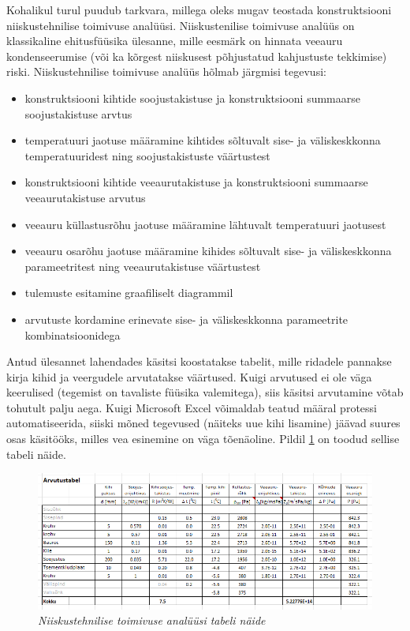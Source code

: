 Kohalikul turul puudub tarkvara, millega oleks mugav teostada konstruktsiooni
 niiskustehnilise toimivuse analüüsi. Niiskustenilise toimivuse analüüs on klassikaline ehitusfüüsika ülesanne, mille 
 eesmärk on hinnata veeauru kondenseerumise (või ka kõrgest niiskusest põhjustatud kahjustuste tekkimise) riski.
Niiskustehnilise toimivuse analüüs hõlmab järgmisi tegevusi:
\begin{itemize}
    \item konstruktsiooni kihtide soojustakistuse ja konstruktsiooni summaarse soojustakistuse arvtus
    \item temperatuuri jaotuse määramine kihtides sõltuvalt sise- ja väliskeskkonna temperatuuridest ning 
    soojustakistuste väärtustest
    \item konstruktsiooni kihtide veeaurutakistuse ja konstruktsiooni summaarse veeaurutakistuse arvutus
    \item veeauru küllastusrõhu jaotuse määramine lähtuvalt temperatuuri jaotusest
    \item veeauru osarõhu jaotuse määramine kihides sõltuvalt sise- ja väliskeskkonna parameetritest ning 
    veeaurutakistuse väärtustest
    \item tulemuste esitamine graafiliselt diagrammil
    \item arvutuste kordamine erinevate sise- ja väliskeskkonna parameetrite kombinatsioonidega
\end{itemize}

Antud ülesannet lahendades käsitsi koostatakse tabelit, mille ridadele pannakse kirja kihid ja veergudele arvutatakse 
väärtused. Kuigi arvutused ei ole väga keerulised (tegemist on tavaliste füüsika valemitega), siis käsitsi arvutamine 
võtab tohutult palju aega. Kuigi Microsoft Excel võimaldab teatud määral protessi automatiseerida, siiski mõned 
tegevused (näiteks uue kihi lisamine) jäävad suures osas käsitööks, milles vea esinemine on väga tõenäoline. Pildil 
\ref{fig:excel_table_sample} on toodud sellise tabeli näide.
\begin{figure}[ht]
    \centering
    \includegraphics[width=.8\textwidth]{figures/problem_statement/04_calc_table.png}
    \caption{\textit{Niiskustehnilise toimivuse analüüsi tabeli näide}}
    \label{fig:excel_table_sample}
\end{figure}

